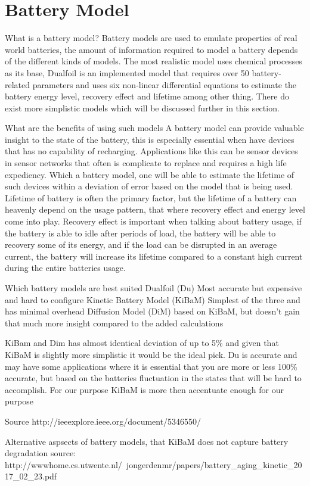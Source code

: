 \section{Battery Model}
What is a battery model?
Battery models are used to emulate properties of real world batteries, the amount of information required to model a battery depends of the different kinds of models. The most realistic model uses chemical processes as its base, Dualfoil is an implemented model that requires over 50 battery-related parameters and uses six non-linear differential equations to estimate the battery energy level, recovery effect and lifetime among other thing. There do exist more simplistic models which will be discussed further in this section.

What are the benefits of using such models
A battery model can provide valuable insight to the state of the battery, this is especially essential when have devices that has no capability of recharging. Applications like this can be sensor devices in sensor networks that often is complicate to replace and requires a high life expediency. Which a battery model, one will be able to estimate the lifetime of such devices within a deviation of error based on the model that is being used. Lifetime of battery is often the primary factor, but the lifetime of a battery can heavenly depend on the usage pattern, that where recovery effect and energy level come into play. Recovery effect is important when talking about battery usage, if the battery is able to idle after periods of load, the battery will be able to recovery some of its energy, and if the load can be disrupted in an average current, the battery will increase its lifetime compared to a constant high current during the entire batteries usage. 

Which battery models are best suited
Dualfoil (Du)
Most accurate but expensive and hard to configure
Kinetic Battery Model (KiBaM)
Simplest of the three and has minimal overhead
Diffusion Model (DiM)
based on KiBaM, but doesn't gain that much more insight compared to the added calculations

KiBam and Dim has almost identical deviation of up to 5\% and given that KiBaM is slightly more simplistic it would be the ideal pick. Du is accurate and may have some applications where it is essential that you are more or less 100\% accurate, but based on the batteries fluctuation in the states that will be hard to accomplish. For our purpose KiBaM is more then accentuate enough for our purpose 

Source
http://ieeexplore.ieee.org/document/5346550/



Alternative aspsects of battery models, that KiBaM does not capture
battery degradation
source: http://wwwhome.cs.utwente.nl/~jongerdenmr/papers/battery_aging_kinetic_2017_02_23.pdf